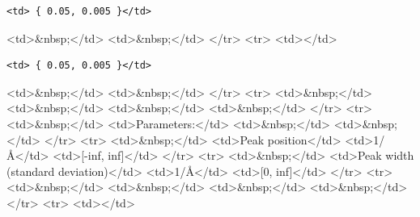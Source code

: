 \begin{verbatim}
<td> { 0.05, 0.005 }</td>
\end{verbatim}

\textless{}td\textgreater{}\&nbsp;\textless{}/td\textgreater{} \textless{}td\textgreater{}\&nbsp;\textless{}/td\textgreater{} \textless{}/tr\textgreater{} \textless{}tr\textgreater{} \textless{}td\textgreater{}\textless{}/td\textgreater{}

\begin{verbatim}
<td> { 0.05, 0.005 }</td>
\end{verbatim}

\textless{}td\textgreater{}\&nbsp;\textless{}/td\textgreater{} \textless{}td\textgreater{}\&nbsp;\textless{}/td\textgreater{} \textless{}/tr\textgreater{} \textless{}tr\textgreater{} \textless{}td\textgreater{}\&nbsp;\textless{}/td\textgreater{} \textless{}td\textgreater{}\&nbsp;\textless{}/td\textgreater{} \textless{}td\textgreater{}\&nbsp;\textless{}/td\textgreater{} \textless{}td\textgreater{}\&nbsp;\textless{}/td\textgreater{} \textless{}/tr\textgreater{} \textless{}tr\textgreater{} \textless{}td\textgreater{}\&nbsp;\textless{}/td\textgreater{} \textless{}td\textgreater{}Parameters:\textless{}/td\textgreater{} \textless{}td\textgreater{}\&nbsp;\textless{}/td\textgreater{} \textless{}td\textgreater{}\&nbsp;\textless{}/td\textgreater{} \textless{}/tr\textgreater{} \textless{}tr\textgreater{} \textless{}td\textgreater{}\&nbsp;\textless{}/td\textgreater{} \textless{}td\textgreater{}Peak position\textless{}/td\textgreater{} \textless{}td\textgreater{}1/\AA{}\textless{}/td\textgreater{} \textless{}td\textgreater{}[-inf, inf]\textless{}/td\textgreater{} \textless{}/tr\textgreater{} \textless{}tr\textgreater{} \textless{}td\textgreater{}\&nbsp;\textless{}/td\textgreater{} \textless{}td\textgreater{}Peak width (standard deviation)\textless{}/td\textgreater{} \textless{}td\textgreater{}1/\AA{}\textless{}/td\textgreater{} \textless{}td\textgreater{}[0, inf]\textless{}/td\textgreater{} \textless{}/tr\textgreater{} \textless{}tr\textgreater{} \textless{}td\textgreater{}\&nbsp;\textless{}/td\textgreater{} \textless{}td\textgreater{}\&nbsp;\textless{}/td\textgreater{} \textless{}td\textgreater{}\&nbsp;\textless{}/td\textgreater{} \textless{}td\textgreater{}\&nbsp;\textless{}/td\textgreater{} \textless{}/tr\textgreater{} \textless{}tr\textgreater{} \textless{}td\textgreater{}\textless{}/td\textgreater{}

